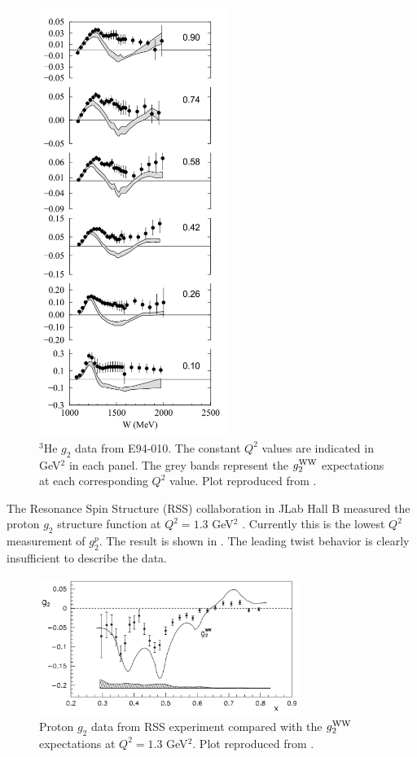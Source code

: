 \begin{figure}[b!]
  \centering
  \includegraphics[width=0.55\textwidth]{figs/g2_E94010.png}
  \caption[${}^3$He $g_2$ data from E94-010.]{${}^3$He $g_2$ data from E94-010. The constant $Q^2$ values are indicated in GeV${}^2$ in each panel. The grey bands represent the $g_2^{\mathrm{WW}}$ expectations at each corresponding $Q^2$ value. Plot reproduced from \cite{Amarian2004a}. \label{C4S1F3}}
\end{figure}

The Resonance Spin Structure (RSS) collaboration in JLab Hall B measured the proton $g_2$ structure function at $Q^2=1.3$ GeV${}^2$ \cite{Wesselmann2007}. Currently this is the lowest $Q^2$ measurement of $g_2^p$. The result is shown in . The leading twist behavior is clearly insufficient to describe the data.

\begin{figure}[tb!]
  \centering
  \includegraphics[width=0.75\textwidth]{figs/g2_RSS.png}
  \caption[Proton $g_2$ data from RSS experiment.]{Proton $g_2$ data from RSS experiment compared with the $g_2^{\mathrm{WW}}$ expectations at $Q^2=1.3$ GeV${}^2$. Plot reproduced from \cite{Wesselmann2007}. \label{C4S1F4}}
\end{figure}

